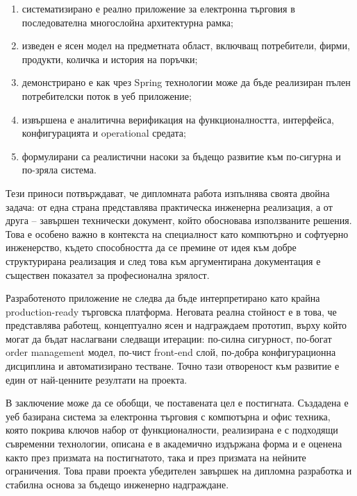 \begin{enumerate}[leftmargin=*]
    \item систематизирано е реално приложение за електронна търговия в последователна многослойна архитектурна рамка;
    \item изведен е ясен модел на предметната област, включващ потребители, фирми, продукти, количка и история на поръчки;
    \item демонстрирано е как чрез Spring технологии може да бъде реализиран пълен потребителски поток в уеб приложение;
    \item извършена е аналитична верификация на функционалността, интерфейса, конфигурацията и operational средата;
    \item формулирани са реалистични насоки за бъдещо развитие към по-сигурна и по-зряла система.
\end{enumerate}

Тези приноси потвърждават, че дипломната работа изпълнява своята двойна задача: от една страна представлява практическа инженерна реализация, а от друга -- завършен технически документ, който обосновава използваните решения. Това е особено важно в контекста на специалност като компютърно и софтуерно инженерство, където способността да се премине от идея към добре структурирана реализация и след това към аргументирана документация е съществен показател за професионална зрялост.

Разработеното приложение не следва да бъде интерпретирано като крайна production-ready търговска платформа. Неговата реална стойност е в това, че представлява работещ, концептуално ясен и надграждаем прототип, върху който могат да бъдат наслагвани следващи итерации: по-силна сигурност, по-богат order management модел, по-чист front-end слой, по-добра конфигурационна дисциплина и автоматизирано тестване. Точно тази отвореност към развитие е един от най-ценните резултати на проекта.

В заключение може да се обобщи, че поставената цел е постигната. Създадена е уеб базирана система за електронна търговия с компютърна и офис техника, която покрива ключов набор от функционалности, реализирана е с подходящи съвременни технологии, описана е в академично издържана форма и е оценена както през призмата на постигнатото, така и през призмата на нейните ограничения. Това прави проекта убедителен завършек на дипломна разработка и стабилна основа за бъдещо инженерно надграждане.
